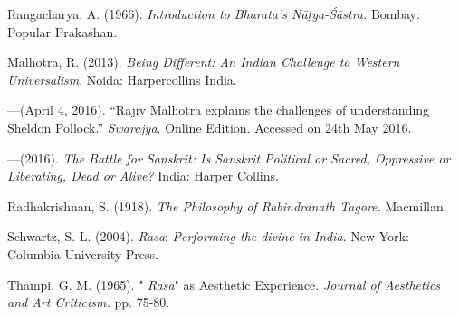 \begin{thebibliography}{99}
Rangacharya, A. (1966). \textsl{Introduction to Bharata's Nāṭya-Śāstra.} Bombay: Popular Prakashan.

Malhotra, R. (2013). \textsl{Being Different: An Indian Challenge to Western Universalism}. Noida: Harpercollins India.

---\kern3pt(April 4, 2016). “Rajiv Malhotra explains the challenges of understanding Sheldon Pollock.” \textsl{Swarajya}. Online Edition. Accessed on 24th May 2016.

---\kern3pt(2016). \textsl{The Battle for Sanskrit: Is Sanskrit Political or Sacred, Oppressive or Liberating, Dead or Alive?} India: Harper Collins.

Radhakrishnan, S. (1918). \textsl{The Philosophy of Rabindranath Tagore.} Macmillan. 

Schwartz, S. L. (2004). \textsl{Rasa}: \textsl{Performing the divine in India}. New York: Columbia University Press. 

Thampi, G. M. (1965). " \textsl{Rasa}" as Aesthetic Experience. \textsl{Journal of Aesthetics and Art Criticism.} pp. 75-80.
\end{thebibliography}

\theendnotes 
